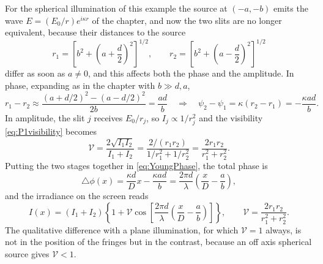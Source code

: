         For the spherical illumination of this example the source at $(-a,-b)$ emits the wave $E = (E_0/r)e^{i\kappa r}$ of the chapter, and now the two slits are no longer equivalent, because their distances to the source
        \begin{equation}\label{eq:Youngr1r2}
            r_1 = \left[b^2 + \left(a+\frac{d}{2}\right)^2\right]^{1/2}, \qquad r_2 = \left[b^2 + \left(a-\frac{d}{2}\right)^2\right]^{1/2}
        \end{equation}
        differ as soon as $a\neq 0$, and this affects both the phase and the amplitude. In phase, expanding as in the chapter with $b\gg d,a$,
        \begin{equation}
            r_1 - r_2 \approx \frac{(a+d/2)^2 - (a-d/2)^2}{2b} = \frac{ad}{b} \quad\Longrightarrow\quad \psi_2 - \psi_1 = \kappa(r_2 - r_1) = -\frac{\kappa a d}{b}.
        \end{equation}
        In amplitude, the slit $j$ receives $E_0/r_j$, so $I_j \propto 1/r_j^2$ and the visibility \ref{eq:P1visibility} becomes
        \begin{equation}\label{eq:YoungVisibility}
            \mathcal{V} = \frac{2\sqrt{I_1 I_2}}{I_1 + I_2} = \frac{2/(r_1 r_2)}{1/r_1^2 + 1/r_2^2} = \frac{2 r_1 r_2}{r_1^2 + r_2^2}.
        \end{equation}
        Putting the two stages together in \ref{eq:YoungPhase}, the total phase is
        \begin{equation}\label{eq:YoungTotalPhase}
            \triangle\phi(x) = \frac{\kappa d}{D}x - \frac{\kappa a d}{b} = \frac{2\pi d}{\lambda}\left(\frac{x}{D} - \frac{a}{b}\right),
        \end{equation}
        and the irradiance on the screen reads
        \begin{equation}\label{eq:YoungIrradiance}
            I(x) = (I_1 + I_2)\left\{ 1 + \mathcal{V}\cos\left[\frac{2\pi d}{\lambda}\left(\frac{x}{D} - \frac{a}{b}\right)\right] \right\}, \qquad \mathcal{V} = \frac{2 r_1 r_2}{r_1^2 + r_2^2}.
        \end{equation}
        The qualitative difference with a plane illumination, for which $\mathcal{V} = 1$ always, is not in the position of the fringes but in the contrast, because an off axis spherical source gives $\mathcal{V} < 1$.


